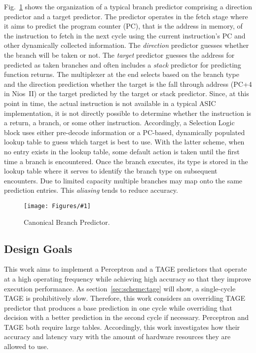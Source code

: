\documentclass[conference]{IEEEtran}
\newcommand{\kfig}[4]{ %
        \begin{figure}[!t]
        \centering
        \texttt{[image: Figures/\#1]}
        \vspace{-1mm}
        \caption{#3}
        \label{#2}
        \end{figure}
}
\begin{document}
Fig.~\ref{fig:bpcanonical} shows the organization of a typical branch predictor comprising a direction predictor and a target predictor.  The predictor operates in the fetch stage where it aims to predict the program counter (PC), that is the address in memory, of the instruction to fetch in the next cycle using the current instruction's PC and other dynamically collected information. The \textit{direction} predictor guesses whether the branch will be taken or not. The \textit{target} predictor guesses the address for predicted as taken branches and often includes a \textit{stack} predictor for predicting function returns. The multiplexer at the end selects based on the branch type and the direction prediction whether the target is the fall through address (PC+4 in Nios~II) or the target predicted by the target or stack predictor. Since, at this point in time, the actual instruction is not available in a typical ASIC implementation, it is not directly possible to determine whether the instruction is a return, a branch, or some other instruction. Accordingly, a Selection Logic block uses either pre-decode information or a PC-based, dynamically populated lookup table to guess which target is best to use. With the latter scheme, when no entry exists in the lookup table, some default action is taken until the first time a branch is encountered. Once the branch executes, its type is stored in the lookup table where it serves to identify the branch type on subsequent encounters. Due to limited capacity multiple branches may map onto the same prediction entries. This \textit{aliasing} tends to reduce accuracy.
\kfig{bpcanonical.pdf}{fig:bpcanonical}{Canonical Branch Predictor.}{angle = 0, trim = 0.2in 1.7in 0.4in 0.6in, clip, width=0.3\textwidth}

\subsection{Design Goals}
\label{sec:background:goal}

This work aims to implement a Perceptron and a TAGE predictors that operate at a high operating frequency while achieving high accuracy so that they improve execution performance. As section~\ref{sec:scheme:tage} will show, a single-cycle TAGE is prohibitively slow. Therefore, this work considers an overriding TAGE predictor that produces a base prediction in one cycle while overriding that decision with a better prediction in the second cycle if necessary. Perceptron and TAGE both require large tables. Accordingly, this work investigates how their accuracy and latency vary with the amount of hardware resources they are allowed to use.
\end{document}
